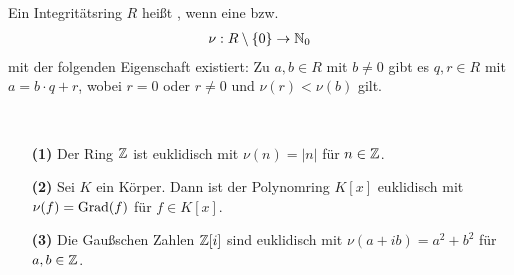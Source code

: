 \begin{df} \label{skript:7.9}
	Ein Integritätsring $R$ heißt , wenn eine  bzw. 
	   
	\begin{align*}
	\nu : R \setminus \lbrace 0 \rbrace \to \mathbb{N}_0
	\end{align*}
	mit der folgenden Eigenschaft existiert:
	Zu $ a,b \in R $ mit $ b \neq 0 $ gibt es $ q,r \in R $ mit $ a = b \cdot q +r $,
	wobei $ r = 0 $ oder $ r \neq 0 $ und $ \nu(r) < \nu(b) $ gilt.
\end{df}

\begin{sz} \label{skript:7.10} \
	\begin{enumerate}
		\item[\textbf{(1)}]
		Der Ring $ \mathbb{Z} $ ist euklidisch mit $ \nu(n) = | n |  $ für $ n \in \mathbb{Z} $.
		
		\item[\textbf{(2)}]
		Sei $ K $ ein Körper. Dann ist der Polynomring $ K[x] $ euklidisch mit $ \nu(f) = \operatorname{Grad}(f) $ für
		$ f \in K[x] $.
		
		\item[\textbf{(3)}]  
		Die Gaußschen Zahlen $ \mathbb{Z}[i] $ sind euklidisch mit $ \nu(a+ib) = a^2 +b^2 $ für $ a,b \in \mathbb{Z} $.
	\end{enumerate}
\end{sz}

